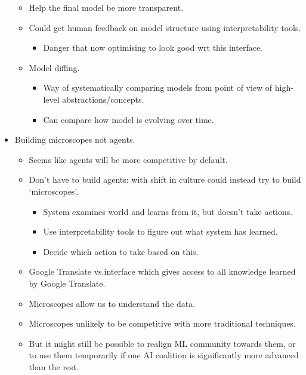 \begin{itemize}
\begin{itemize}
        \item Help the final model be more transparent.
        \item Could get human feedback on model structure using interpretability tools.
        \begin{itemize}
            \item Danger that now optimising to look good wrt this interface.
        \end{itemize}
        \item Model diffing.
        \begin{itemize}
            \item Way of systematically comparing models from point of view of high-level abstractions/concepts.
            \item Can compare how model is evolving over time.
        \end{itemize}
    \end{itemize}
    \item Building microscopes not agents.
    \begin{itemize}
        \item Seems like agents will be more competitive by default.
        \item Don't have to build agents: with shift in culture could instead try to build `microscopes'.
        \begin{itemize}
            \item System examines world and learns from it, but doesn't take actions.
            \item Use interpretability tools to figure out what system has learned.
            \item Decide which action to take based on this.
        \end{itemize}
        \item Google Translate vs.\@ interface which gives access to all knowledge learned by Google Translate.
        \item Microscopes allow us to understand the data.
        \item Microscopes unlikely to be competitive with more traditional techniques.
        \item But it might still be possible to realign ML community towards them, or to use them temporarily if one AI coalition is significantly more advanced than the rest.
    \end{itemize}
\end{itemize}


